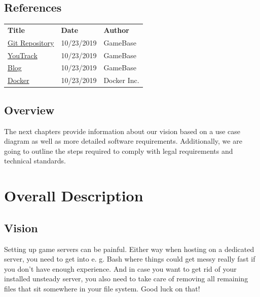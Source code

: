 \documentclass[a4paper,12pt,chapterprefix=false,bibliography=totoc,listof=totoc,]{scrreprt}
\begin{document}
\section{References}
\begin{table}[H]
	\centering
	\everyrow{\hline}
	\begin{tabu} to \textwidth {|X[c]|X[c]|X[c]|}
		\textbf{Title} & \textbf{Date} & \textbf{Author} \\
		\href{https://gitlab.tandashi.de/GameBase}{Git Repository} & 10/23/2019 & GameBase \\
		\href{https://youtrack.gahr.dev}{YouTrack} & 10/23/2019 & GameBase \\
		\href{https://gahr.dev}{Blog} & 10/23/2019 & GameBase \\
		\href{https://www.docker.com/}{Docker} & 10/23/2019 & Docker Inc. \\		
	\end{tabu}
	\label{tab:references-tabview}
\end{table}

\section{Overview}
The next chapters provide information about our vision based on a use case diagram as well as more detailed software requirements. Additionally, we are going to outline the steps required to comply with legal requirements and technical standards.

\chapter{Overall Description}
\section{Vision}
Setting up game servers can be painful. Either way when hosting on a dedicated server, you need to get into e. g. Bash where things could get messy really fast if you don't have enough experience. And in case you want to get rid of your installed unsteady server, you also need to take care of removing all remaining files that sit somewhere in your file system. Good luck on that!
\end{document}
